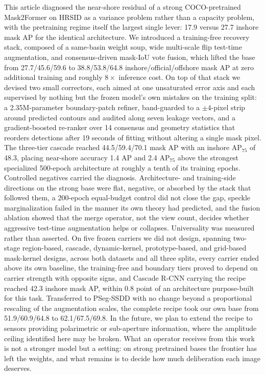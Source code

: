 This article diagnosed the near-shore residual of a strong COCO-pretrained Mask2Former on HRSID as a variance problem rather than a capacity problem, with the pretraining regime itself the largest single lever: 17.9 versus 27.7 inshore mask AP for the identical architecture. We introduced a training-free recovery stack, composed of a same-basin weight soup, wide multi-scale flip test-time augmentation, and consensus-driven mask-IoU vote fusion, which lifted the base from 27.7/45.6/59.6 to 38.8/53.8/64.8 inshore/official/offshore mask AP at zero additional training and roughly $8\times$ inference cost. On top of that stack we devised two small correctors, each aimed at one unsaturated error axis and each supervised by nothing but the frozen model's own mistakes on the training split: a 2.35M-parameter boundary-patch refiner, band-guarded to a $\pm 4$-pixel strip around predicted contours and audited along seven leakage vectors, and a gradient-boosted re-ranker over 14 consensus and geometry statistics that reorders detections after 19 seconds of fitting without altering a single mask pixel. The three-tier cascade reached 44.5/59.4/70.1 mask AP with an inshore AP$_{75}$ of 48.3, placing near-shore accuracy 1.4 AP and 2.4 AP$_{75}$ above the strongest specialized 500-epoch architecture at roughly a tenth of its training epochs. Controlled negatives carried the diagnosis. Architecture- and training-side directions on the strong base were flat, negative, or absorbed by the stack that followed them, a 200-epoch equal-budget control did not close the gap, speckle marginalization failed in the manner its own theory had predicted, and the fusion ablation showed that the merge operator, not the view count, decides whether aggressive test-time augmentation helps or collapses. Universality was measured rather than asserted. On five frozen carriers we did not design, spanning two-stage region-based, cascade, dynamic-kernel, prototype-based, and grid-based mask-kernel designs, across both datasets and all three splits, every carrier ended above its own baseline, the training-free and boundary tiers proved to depend on carrier strength with opposite signs, and Cascade R-CNN carrying the recipe reached 42.3 inshore mask AP, within 0.8 point of an architecture purpose-built for this task. Transferred to PSeg-SSDD with no change beyond a proportional rescaling of the augmentation scales, the complete recipe took our own base from 51.9/60.9/64.8 to 62.1/67.5/69.8. In the future, we plan to extend the recipe to sensors providing polarimetric or sub-aperture information, where the amplitude ceiling identified here may be broken. What an operator receives from this work is not a stronger model but a setting: on strong pretrained bases the frontier has left the weights, and what remains is to decide how much deliberation each image deserves.
